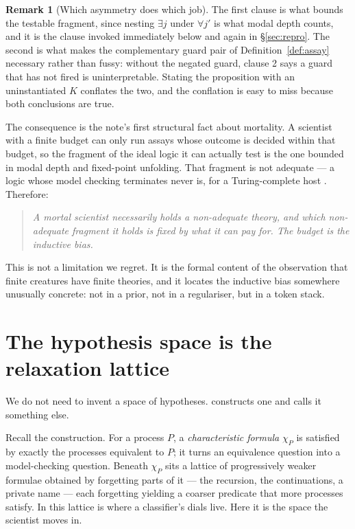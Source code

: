 \documentclass[11pt]{article}
\theoremstyle{plain}
\theoremstyle{definition}
\newtheorem{remark}[theorem]{Remark}
\begin{document}
\begin{remark}[Which asymmetry does which job]
\label{rem:whichasym}
The first clause is what bounds the testable fragment, since nesting $\exists j$ under $\forall j'$
is what modal depth counts, and it is the clause invoked immediately below and again in
\S\ref{sec:repro}. The second is what makes the complementary guard pair of
Definition~\ref{def:assay} necessary rather than fussy: without the negated guard, clause 2 says a
guard that has not fired is uninterpretable. Stating the proposition with an uninstantiated $K$
conflates the two, and the conflation is easy to miss because both conclusions are true.
\end{remark}

The consequence is the note's first structural fact about mortality. A scientist with a finite budget
can only run assays whose outcome is decided within that budget, so the fragment of the ideal logic it
can actually test is the one bounded in modal depth and fixed-point unfolding. That fragment is not
adequate --- a logic whose model checking terminates never is, for a Turing-complete host
\cite[\S1.3]{ClassifierNote}. Therefore:

\begin{quote}
\itshape A mortal scientist necessarily holds a non-adequate theory, and which non-adequate fragment
it holds is fixed by what it can pay for. The budget is the inductive bias.
\end{quote}

This is not a limitation we regret. It is the formal content of the observation that finite creatures
have finite theories, and it locates the inductive bias somewhere unusually concrete: not in a prior,
not in a regulariser, but in a token stack.

\section{The hypothesis space is the relaxation lattice}
\label{sec:lattice}

We do not need to invent a space of hypotheses. \cite[\S3.3]{ClassifierNote} constructs one and calls
it something else.

Recall the construction. For a process $P$, a \emph{characteristic formula} $\chi_P$ is satisfied by
exactly the processes equivalent to $P$; it turns an equivalence question into a model-checking
question. Beneath $\chi_P$ sits a lattice of progressively weaker formulae obtained by forgetting
parts of it --- the recursion, the continuations, a private name --- each forgetting yielding a
coarser predicate that more processes satisfy. In \cite{ClassifierNote} this lattice is where a
classifier's dials live. Here it is the space the scientist moves in.
\end{document}
